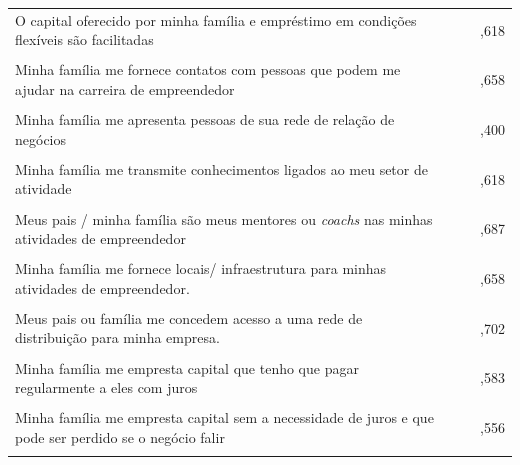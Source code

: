 \begin{longtable}[!h]{p{6cm} c c c }
O capital oferecido por minha família e empréstimo em condições flexíveis são facilitadas
 &  & & ,618 \\\\
 
Minha família me fornece contatos com pessoas que podem me ajudar na carreira de empreendedor
 &  & & ,658 \\\\
 
Minha família me apresenta pessoas de sua rede de relação de negócios
 &  & & ,400 \\\\
 
Minha família me transmite conhecimentos ligados ao meu setor de atividade
 &  & & ,618 \\\\
 
Meus pais / minha família são meus mentores ou \textit{coachs} nas minhas atividades de empreendedor
 &  & & ,687 \\\\
 
Minha família me fornece locais/ infraestrutura para minhas atividades de empreendedor.
 &  & & ,658 \\\\
 
Meus pais ou família me concedem acesso a uma rede de distribuição para minha empresa.
 &  & & ,702 \\\\
 
 
Minha família me empresta capital que  tenho que pagar regularmente a eles com juros		
 &  & & ,583 \\\\
 
Minha família me empresta capital sem a necessidade de juros e que pode ser perdido se o negócio falir
 & & & ,556 \\\\ \hline 
 
\end{longtable}



